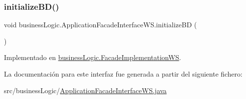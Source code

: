 \subsubsection{\texorpdfstring{initializeBD()}{initializeBD()}}
{\footnotesize\ttfamily void business\+Logic.\+Application\+Facade\+Interface\+W\+S.\+initialize\+BD (\begin{DoxyParamCaption}{ }\end{DoxyParamCaption})}



Implementado en \mbox{\hyperlink{classbusiness_logic_1_1_facade_implementation_w_s_a94a4600e9c80794676f06c888e9e682d}{business\+Logic.\+Facade\+Implementation\+WS}}.



La documentación para este interfaz fue generada a partir del siguiente fichero\+:\begin{DoxyCompactItemize}
\item 
src/business\+Logic/\mbox{\hyperlink{_application_facade_interface_w_s_8java}{Application\+Facade\+Interface\+W\+S.\+java}}\end{DoxyCompactItemize}
